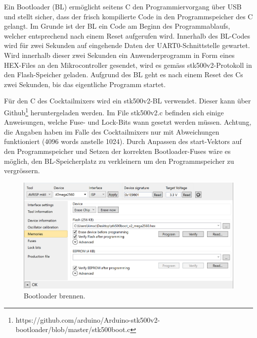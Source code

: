 Ein Bootloader (BL) ermöglicht seitens \textmu C den Programmiervorgang über USB und stellt sicher, dass der frisch kompilierte Code in den Programmspeicher des \textmu C gelangt. Im Grunde ist der BL ein Code am Beginn des Programmablaufs, welcher entsprechend nach einem Reset aufgerufen wird. Innerhalb des BL-Codes wird für zwei Sekunden auf eingehende Daten der UART0-Schnittstelle gewartet.
Wird innerhalb dieser zwei Sekunden ein Anwenderprogramm in Form eines HEX-Files an den Mikrocontroller gesendet, wird es gemäss stk500v2-Protokoll  in den Flash-Speicher geladen.
Aufgrund des BL geht es nach einem Reset des \textmu Cs zwei Sekunden, bis das eigentliche Programm startet.

Für den \textmu C des Cocktailmixers wird ein stk500v2-BL verwendet. Dieser kann über Github\footnote{https://github.com/arduino/Arduino-stk500v2-bootloader/blob/master/stk500boot.c
} heruntergeladen werden. Im File stk500v2.c befinden sich einige Anweisungen, welche Fuse- und Lock-Bits wann gesetzt werden müssen. Achtung, die Angaben haben im Falle des Cocktailmixers nur mit Abweichungen funktioniert (4096 words anstelle 1024). Durch Anpassen des start-Vektors auf den Programmspeicher und Setzen der korrekten Bootloader-Fuses wäre es möglich, den BL-Speicherplatz zu verkleinern um den Programmspeicher zu vergrössern.



\begin{figure}[H]
	\centering
	\includegraphics[width=\textwidth]{graphics/AtmelStudio_Program_Bootloader}
	\caption{Bootloader brennen.}
	\label{fig:AtmelStudio_Program_Bootloader}
\end{figure}

